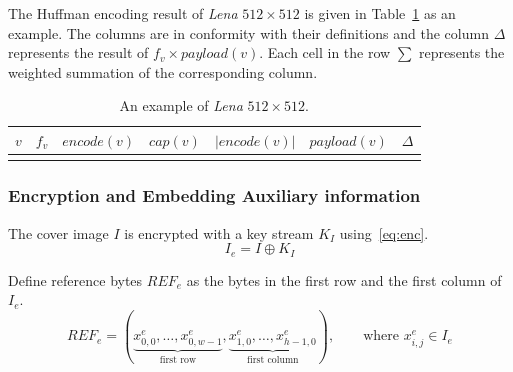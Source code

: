 The Huffman encoding result of \emph{Lena} $512 \times 512$ is given in Table~\ref{tab:msblena} as an example.
The columns are in conformity with their definitions and the column \emph{$\Delta$} represents the result of $f_v \times payload(v)$. 
Each cell in the row \emph{$\sum$} represents the weighted summation of the corresponding column.

\begin{table}
	\centering
	\caption{An example of \emph{Lena} $512 \times 512$.}
	\label{tab:msblena}
	\begin{tabular}{crlcccr}
		\toprule 
		$v$ &   \multicolumn{1}{c}{$f_v$} &     \multicolumn{1}{c}{$encode(v)$}  &  $cap(v)$ &    $\vert encode(v) \vert$    & $payload(v)$  & $\Delta$ \\
		\midrule 
		\singlelenamsb
		\bottomrule
	\end{tabular}
\end{table}


\subsubsection{Encryption and Embedding Auxiliary information}

The cover image $I$ is encrypted with a key stream $K_I$ using~\eqref{eq:enc}.
\begin{equation}
	\label{eq:enc}
	I_e = I \oplus K_I
\end{equation}

Define reference bytes $REF_e$ as the bytes in the first row and the first column of $I_e$.
\begin{equation*}
	REF_e = (\underbrace{x^e_{0, 0}, \dots, x^e_{0, w - 1}}_{\text{first row}}, \underbrace{x^e_{1, 0}, \dots, x^e_{h - 1, 0}}_{\text{first column}}), \qquad \text{where } x^e_{i, j} \in I_e
\end{equation*}

